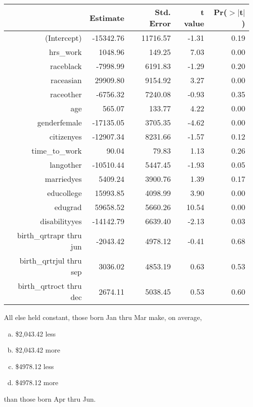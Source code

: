 \documentclass[11pt,containsverbatim,handout,xcolor=xelatex,dvipsnames,table]{beamer}
\newcommand{\solnMult}[1]{#1}
\begin{document}

\begin{frame}


\begin{center}
{\tiny
\begin{tabular}{rrrrr}
  \hline
 & Estimate & Std. Error & t value & Pr($>$$|$t$|$) \\ 
  \hline
(Intercept) & -15342.76 & 11716.57 & -1.31 & 0.19 \\ 
  hrs\_work & 1048.96 & 149.25 & 7.03 & 0.00 \\ 
  raceblack & -7998.99 & 6191.83 & -1.29 & 0.20 \\ 
  raceasian & 29909.80 & 9154.92 & 3.27 & 0.00 \\ 
  raceother & -6756.32 & 7240.08 & -0.93 & 0.35 \\ 
  age & 565.07 & 133.77 & 4.22 & 0.00 \\ 
  genderfemale & -17135.05 & 3705.35 & -4.62 & 0.00 \\ 
  citizenyes & -12907.34 & 8231.66 & -1.57 & 0.12 \\ 
  time\_to\_work & 90.04 & 79.83 & 1.13 & 0.26 \\ 
  langother & -10510.44 & 5447.45 & -1.93 & 0.05 \\ 
  marriedyes & 5409.24 & 3900.76 & 1.39 & 0.17 \\ 
  educollege & 15993.85 & 4098.99 & 3.90 & 0.00 \\ 
  edugrad & 59658.52 & 5660.26 & 10.54 & 0.00 \\ 
  disabilityyes & -14142.79 & 6639.40 & -2.13 & 0.03 \\ 
  birth\_qrtrapr thru jun & -2043.42 & 4978.12 & -0.41 & 0.68 \\ 
  birth\_qrtrjul thru sep & 3036.02 & 4853.19 & 0.63 & 0.53 \\ 
  birth\_qrtroct thru dec & 2674.11 & 5038.45 & 0.53 & 0.60 \\ 
   \hline
\end{tabular}
}
\end{center}

{\footnotesize
All else held constant, those born Jan thru Mar make, on average,
\begin{multicols}{4}
\begin{enumerate}[(a)]
\item \$2,043.42 less
\item \solnMult{\$2,043.42 more}
\item \$4978.12 less
\item \$4978.12 more
\end{enumerate}
\end{multicols}
\vspace{-0.5cm}
than those born Apr thru Jun.
}

\end{frame}
\end{document}
